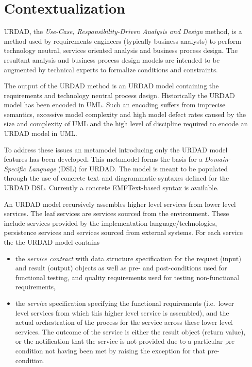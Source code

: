\section{Contextualization}

URDAD, the {\em Use-Case, Responsibility-Driven Analysis and Design} \cite{solms_urdad_2010, solms_generating_2009, solms_technology_2007} method, is a method used by requirements engineers (typically business analysts) to perform technology neutral, services oriented analysis and business process design. The resultant analysis and business process design models are intended to be augmented by technical experts to formalize conditions and constraints.

The output of the URDAD method is an URDAD model containing the requirements and technology neutral process design. Historically the URDAD model has been encoded in UML. Such an encoding suffers from imprecise semantics, excessive model complexity and high model defect rates caused by the size and complexity of UML and the high level of discipline required to encode an URDAD model in UML.

To address these issues an metamodel introducing only the URDAD model features has been developed. This metamodel forms the basis for a {\em Domain-Specific Language} (DSL) for URDAD.  The model is meant to be populated through the use of concrete text and diagrammatic syntaxes defined for the URDAD DSL. Currently a concrete EMFText-based syntax is available.

An URDAD model recursively assembles higher level services from lower level services. The leaf services are services sourced from the environment. These include services provided by the implementation language/technologies, persistence services and services sourced from external systems. For each service the the URDAD model contains
\begin{itemize}
 \item the \textit{service contract} with data structure specification for the request (input) and result (output) objects as well as pre- and post-conditions used for functional testing, and quality requirements used for testing non-functional requirements,
 \item the \textit{service} specification specifying the functional requirements (i.e.\ lower level services from which this higher level service is assembled), and the actual orchestration of the process for the service across these lower level services. The outcome of the service is either the result object (return value), or the notification that the service is not provided due to a particular pre-condition not having been met by raising the exception for that pre-condition.
\end{itemize}


